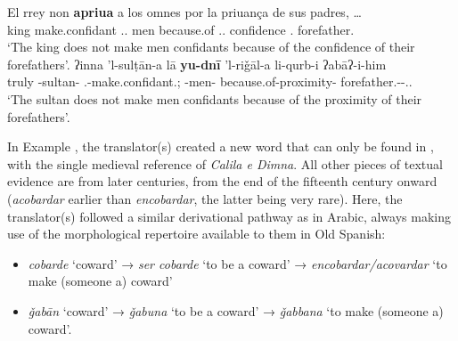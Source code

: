 \documentclass[output=paper]{langscibook}
\begin{document}
\setcounter{footnote}{17}

\begin{exe}
    \ex\label{doehla:ex:11}
    \begin{xlist}
        \ex\label{doehla:ex:11a}
        \gll El rrey non \textbf{apriua} a los omnes por la priuança de sus padres, … \\
        \Def{} king \NEG{} make.confidant \OBJ{} \Def.\M.\PL{} men because.of \Def.\F.\SG{} confidence \GEN{} \POSS.\Third\PL{} forefather.\PL{} {} \\
        \glt ‘The king does not make men confidants because of the confidence of their forefathers’. \citep[AI.41a]{dohla_libro_2009}
        \ex\label{doehla:ex:11b}
        \gll ʔinna 'l-sulṭān-a lā \textbf{yu-dnī} 'l-riǧāl-a li-qurb-i ʔabāʔ-i-him \\
        truly \Def-sultan-\ACC{} \NEG{} \Third\SG.\M-make.confidant.\IPFV;\IND{} \Def-men-\ACC{} because.of-proximity-\GEN{} forefather.\PL-\GEN-\POSS.\Third\PL.\M{} \\
        \glt ‘The sultan does not make men confidants because of the proximity of their forefathers’. \citep[fo. 29v]{ibn_al-muqaffa_kitab_nodate}
    \end{xlist}
\end{exe}


In Example , the translator(s) created a new word that can only be found in \citet[I, 443]{muller_diccionario_1987}, %
with the single medieval reference of \textit{Calila e Dimna}. All other pieces of textual evidence are from later centuries, from the end of the fifteenth century onward (\textit{acobardar} earlier than \textit{encobardar}, the latter being very rare). Here, the translator(s) followed a similar derivational pathway as in Arabic, always making use of the morphological repertoire available to them in Old Spanish:

\begin{itemize}
\item[]\textit{cobarde} ‘coward’ → \textit{ser cobarde} ‘to be a coward’ → \textit{encobardar/acovardar} ‘to make (someone a) coward’
\item[]\textit{ǧabān} ‘coward’ → \textit{ǧabuna} ‘to be a coward’ → \textit{ǧabbana} ‘to make (someone a) coward’.
\end{itemize}
\end{document}
